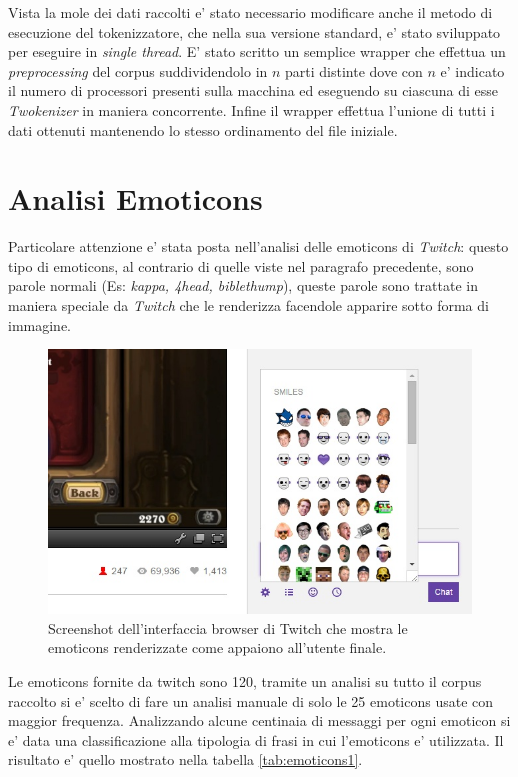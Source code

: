 \documentclass[a4paper,12pt,openright,twoside]{report}
\theoremstyle{definition}
\begin{document}
Vista la mole dei dati raccolti e' stato necessario modificare anche il metodo di esecuzione del tokenizzatore, 
che nella sua versione standard, e' stato sviluppato per eseguire in \emph{single thread}.
E' stato scritto un semplice wrapper che effettua un \emph{preprocessing} del corpus suddividendolo in $n$ parti distinte dove con $n$ e' indicato il numero di processori presenti sulla macchina ed
eseguendo su ciascuna di esse \emph{Twokenizer} in maniera concorrente.
Infine il wrapper effettua l'unione di tutti i dati ottenuti mantenendo lo stesso ordinamento del file iniziale.

\section{Analisi Emoticons}
Particolare attenzione e' stata posta nell'analisi delle emoticons di \emph{Twitch}: questo tipo di emoticons,
al contrario di quelle viste nel paragrafo precedente, sono parole normali (Es: \emph{kappa, 4head, biblethump}),
queste parole sono trattate in maniera speciale da \emph{Twitch} che le renderizza facendole apparire sotto forma di immagine.

\begin{figure}[ht]
	\centering
	\includegraphics[scale=0.5]{Immagini/TwitchEmotes.jpg}
	\caption{Screenshot dell'interfaccia browser di Twitch che mostra le emoticons renderizzate
	come appaiono all'utente finale.}
	\label{fig:TwitchEmotes}
\end{figure}

Le emoticons fornite da twitch sono 120, tramite un analisi su tutto il corpus raccolto si e' scelto di fare un analisi
manuale di solo le 25 emoticons usate con maggior frequenza. Analizzando alcune centinaia di messaggi per ogni emoticon
si e' data una classificazione alla tipologia di frasi in cui l'emoticons e' utilizzata. Il risultato e'
quello mostrato nella tabella \ref{tab:emoticons1}.
\end{document}
